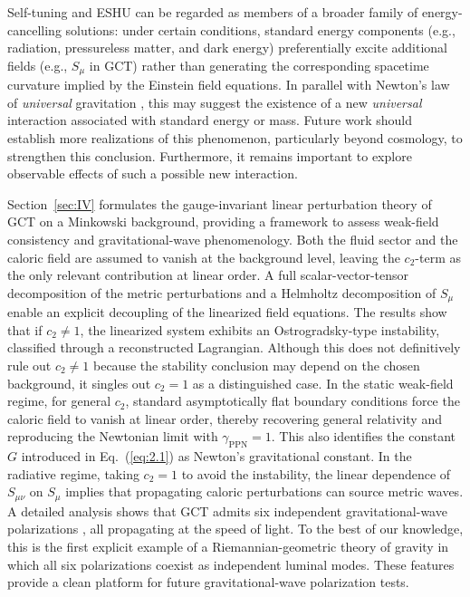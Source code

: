 \documentclass[aps,prd,twocolumn]{revtex4-2}
\begin{document}
Self-tuning and ESHU can be regarded as members of a broader family of energy-cancelling solutions: under certain conditions, standard energy components (e.g., radiation, pressureless matter, and dark energy) preferentially excite additional fields (e.g., $S_\mu$ in GCT) rather than generating the corresponding spacetime curvature implied by the Einstein field equations. In parallel with Newton's law of \textit{universal} gravitation \cite{Newton1687.book}, this may suggest the existence of a new \textit{universal} interaction associated with standard energy or mass. Future work should establish more realizations of this phenomenon, particularly beyond cosmology, to strengthen this conclusion. Furthermore, it remains important to explore observable effects of such a possible new interaction.

Section~\ref{sec:IV} formulates the gauge-invariant linear perturbation theory of GCT on a Minkowski background, providing a framework to assess weak-field consistency and gravitational-wave phenomenology. Both the fluid sector and the caloric field are assumed to vanish at the background level, leaving the $c_2$-term as the only relevant contribution at linear order. A full scalar-vector-tensor decomposition of the metric perturbations and a Helmholtz decomposition of $S_\mu$ enable an explicit decoupling of the linearized field equations. The results show that if $c_2\neq1$, the linearized system exhibits an Ostrogradsky-type instability, classified through a reconstructed Lagrangian. Although this does not definitively rule out $c_2\neq1$ because the stability conclusion may depend on the chosen background, it singles out $c_2=1$ as a distinguished case. In the static weak-field regime, for general $c_2$, standard asymptotically flat boundary conditions force the caloric field to vanish at linear order, thereby recovering general relativity and reproducing the Newtonian limit with $\gamma_\mathrm{PPN}=1$. This also identifies the constant $G$ introduced in Eq.~(\ref{eq:2.1}) as Newton's gravitational constant. In the radiative regime, taking $c_2=1$ to avoid the instability, the linear dependence of $S_{\mu\nu}$ on $S_\mu$ implies that propagating caloric perturbations can source metric waves. A detailed analysis shows that GCT admits six independent gravitational-wave polarizations \cite{Eardley1973.PRD.8.3308,Eardley1973.PRL.30.884}, all propagating at the speed of light. To the best of our knowledge, this is the first explicit example of a Riemannian-geometric theory of gravity in which all six polarizations coexist as independent luminal modes. These features provide a clean platform for future gravitational-wave polarization tests.
\end{document}
